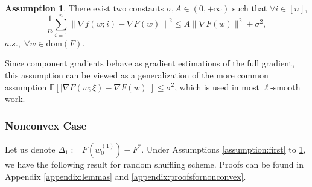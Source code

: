 \documentclass{article} %
\theoremstyle{plain}
\newtheorem{theorem}{Theorem}[section]
\theoremstyle{definition}
\newtheorem{assumption}[theorem]{Assumption}
\theoremstyle{remark}
\begin{document}
\begin{assumption}
    \label{assumption:varianceexpectation}
There exist two constants $\sigma, A\in(0,+\infty)$ such that $\forall i\in [n]$,
\begin{equation}
\frac{1}{n}\sum_{i=1}^n\left\| \nabla f(w; i) - \nabla F(w) \right\|^2 \leq A\|\nabla F(w)\|^2+\sigma^2, 
\end{equation}
$a.s., \; \forall w \in \text{dom} (F).$
\end{assumption}

Since component gradients behave as gradient estimations of the full gradient, this assumption can be viewed as a generalization of the more common assumption $\mathbb{E}[|\nabla F(w;\xi)-\nabla F(w)|]\leq \sigma^2$, which is used in most $\ell$-smooth work.


\subsubsection{Nonconvex Case}
\label{section:nonconvex}

Let us denote $\Delta_1:=F(w^{(1)}_0)-F^*$. Under Assumptions \ref{assumption:first} to \ref{assumption:varianceexpectation}, we have the following result for random shuffling scheme. Proofs can be found in Appendix \ref{appendix:lemmas} and \ref{appendix:proofsfornonconvex}.

\end{document}
